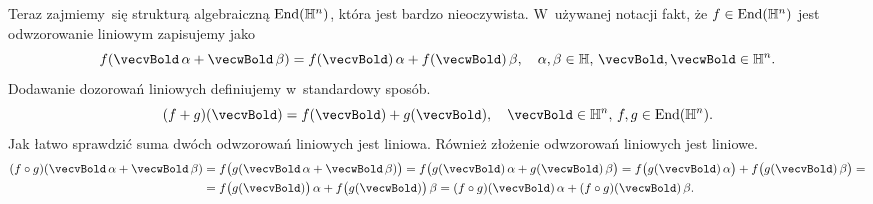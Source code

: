 \documentclass[a4paper,11pt]{article}
\numberwithin{equation}{section}
\begin{document}
Teraz zajmiemy~się strukturą algebraiczną $\mathrm{End}( \mathbb{H}^{ n } )$, która jest
bardzo nieoczywista. W~używanej notacji fakt, że $f \in \mathrm{End}( \mathbb{H}^{ n } )$
jest odwzorowanie liniowym zapisujemy jako
\begin{equation}
  \label{eq:Wojtynski-69}
  f( \vecvBold \, \alpha + \vecwBold \, \beta ) =
  f( \vecvBold ) \, \alpha + f( \vecwBold ) \, \beta, \quad
  \alpha, \beta \in \Hbb, \, \vecvBold, \vecwBold \in \Hbb^{ n }.
\end{equation}
Dodawanie dozorowań liniowych definiujemy w~standardowy sposób.
\begin{equation}
  \label{eq:Wojtynski-70}
  ( f + g )( \vecvBold ) = f( \vecvBold ) + g( \vecvBold ), \quad
  \vecvBold \in \Hbb^{ n }, \, f, g \in \End( \Hbb^{ n } ).
\end{equation}
Jak łatwo sprawdzić suma dwóch odwzorowań liniowych jest liniowa.
Również złożenie odwzorowań liniowych jest liniowe.
\begin{equation}
  \label{eq:Wojtynski-71}
  \begin{split}
    ( f \circ g )( \vecvBold \, \alpha + \vecwBold \, \beta )
    &=
      f\big( g( \vecvBold \, \alpha + \vecwBold \, \beta ) \big) =
      f\big( g( \vecvBold ) \, \alpha + g( \vecwBold ) \, \beta \big) =
      f\big( g( \vecvBold ) \, \alpha \big)
      + f\big( g( \vecvBold ) \, \beta \big) = \\
    &=
      f\big( g( \vecvBold ) \big) \, \alpha
      + f\big( g( \vecwBold ) \big) \, \beta =
      ( f \circ g )( \vecvBold ) \, \alpha + ( f \circ g )( \vecwBold ) \, \beta.
  \end{split}
\end{equation}
\end{document}
